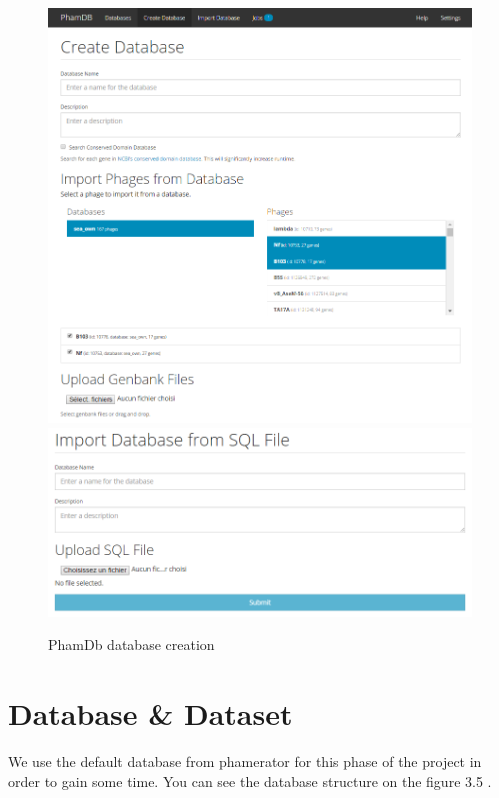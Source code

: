 \documentclass[a4paper,11pt]{report}
\begin{document}
\begin{figure}[H] 
	\begin{center}
		\includegraphics[scale=0.45]{img/phamdb_create_db}
		\includegraphics[scale=0.45]{img/phamdb_create_db_2}
		\caption{PhamDb database creation}
	\end{center}
\end{figure}

\section{Database \& Dataset}
We use the default database from phamerator for this phase of the project in order to gain some time. You can see the database structure on the figure 3.5 .
\end{document}
